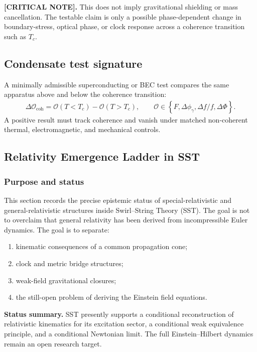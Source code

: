 \textbf{[CRITICAL NOTE].}
This does not imply gravitational shielding or mass cancellation. The testable
claim is only a possible phase-dependent change in boundary-stress, optical
phase, or clock response across a coherence transition such as \(T_c\).

\subsection{Condensate test signature}

A minimally admissible superconducting or BEC test compares the same apparatus
above and below the coherence transition:
\begin{align}
    \Delta\mathcal{O}_{\mathrm{coh}}
    =
    \mathcal{O}(T<T_c)-\mathcal{O}(T>T_c),
    \qquad
    \mathcal{O}
    \in
    \left\{
    F,
    \Delta\phi_\gamma,
    \Delta f/f,
    \Delta\Phi
    \right\}.
    \label{eq:rt_condensate_test_signature}
\end{align}
A positive result must track coherence and vanish under matched non-coherent
thermal, electromagnetic, and mechanical controls.

\subsection{Relativity Emergence Ladder in SST}
\label{sec:rt_relativity_emergence_ladder}

\subsubsection{Purpose and status}

This section records the precise epistemic status of special-relativistic and
general-relativistic structures inside Swirl--String Theory (SST). The goal is
not to overclaim that general relativity has been derived from incompressible
Euler dynamics. The goal is to separate:
\begin{enumerate}
    \item kinematic consequences of a common propagation cone;
    \item clock and metric bridge structures;
    \item weak-field gravitational closures;
    \item the still-open problem of deriving the Einstein field equations.
\end{enumerate}

\textbf{Status summary.} SST presently supports a conditional reconstruction of
relativistic kinematics for its excitation sector, a conditional weak
equivalence principle, and a conditional Newtonian limit. The full
Einstein--Hilbert dynamics remain an open research target.

